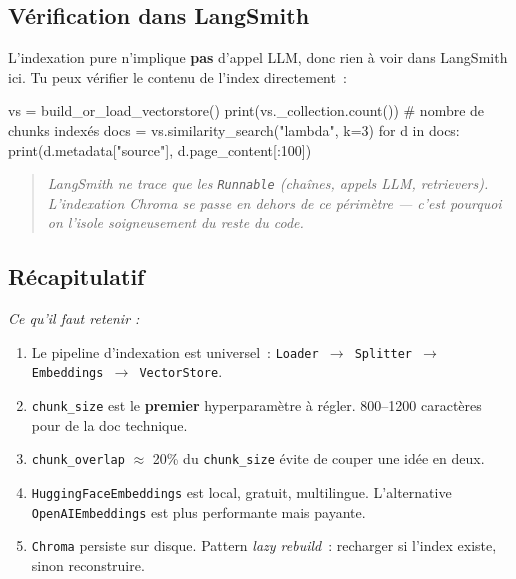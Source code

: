 \documentclass[11pt,a4paper]{article}
\begin{document}
\subsection{Vérification dans LangSmith}

L'indexation pure n'implique \textbf{pas} d'appel LLM, donc rien à voir
dans LangSmith ici. Tu peux vérifier le contenu de l'index directement~:

\begin{pythoncode}
vs = build_or_load_vectorstore()
print(vs._collection.count())          # nombre de chunks indexés
docs = vs.similarity_search("lambda", k=3)
for d in docs:
    print(d.metadata["source"], d.page_content[:100])
\end{pythoncode}

\begin{quote}\itshape
LangSmith ne trace que les \texttt{Runnable} (chaînes, appels LLM,
retrievers). L'indexation Chroma se passe \emph{en dehors} de ce
périmètre — c'est pourquoi on l'isole soigneusement du reste du code.
\end{quote}

\subsection*{Récapitulatif}
{\itshape\sloppy
\textit{Ce qu'il faut retenir :}
\begin{enumerate}[leftmargin=*]
  \item Le pipeline d'indexation est universel~: \texttt{Loader $\to$
        Splitter $\to$ Embeddings $\to$ VectorStore}.
  \item \texttt{chunk\_size} est le \textbf{premier} hyperparamètre à
        régler. 800--1200 caractères pour de la doc technique.
  \item \texttt{chunk\_overlap} $\approx$ 20\% du \texttt{chunk\_size}
        évite de couper une idée en deux.
  \item \texttt{HuggingFaceEmbeddings} est local, gratuit, multilingue.
        L'alternative \texttt{OpenAIEmbeddings} est plus performante mais
        payante.
  \item \texttt{Chroma} persiste sur disque. Pattern \emph{lazy rebuild}~:
        recharger si l'index existe, sinon reconstruire.
\end{enumerate}
\par}

\end{document}
